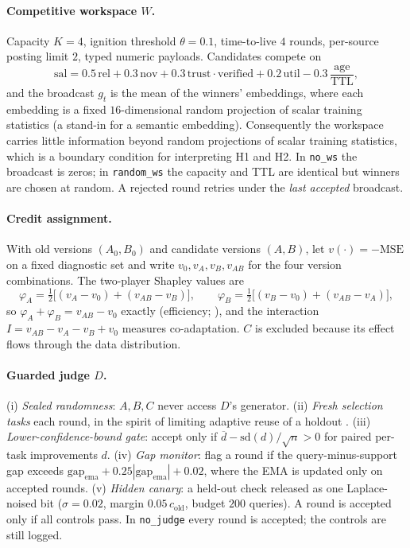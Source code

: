 \documentclass[11pt]{article}
\begin{document}
\paragraph{Competitive workspace $W$.} Capacity $K=4$, ignition threshold $\theta=0.1$, time-to-live $4$ rounds, per-source posting limit $2$, typed numeric payloads.
Candidates compete on
\begin{equation}
\text{sal}=0.5\,\text{rel}+0.3\,\text{nov}+0.3\,\text{trust}\cdot\text{verified}+0.2\,\text{util}-0.3\,\frac{\text{age}}{\text{TTL}},
\end{equation}
and the broadcast $g_t$ is the mean of the winners' embeddings, where each embedding is a fixed $16$-dimensional random projection of scalar
training statistics (a stand-in for a semantic embedding). Consequently the workspace carries little information beyond random projections of scalar
training statistics, which is a boundary condition for interpreting H1 and H2. In \texttt{no\_ws} the broadcast is zeros; in \texttt{random\_ws} the capacity and TTL are identical but winners are chosen at random.
A rejected round retries under the \emph{last accepted} broadcast.

\paragraph{Credit assignment.} With old versions $(A_0,B_0)$ and candidate versions $(A,B)$, let $v(\cdot)=-\text{MSE}$ on a fixed diagnostic set
and write $v_0,v_A,v_B,v_{AB}$ for the four version combinations. The two-player Shapley values are
\begin{equation}
\varphi_A=\tfrac12\big[(v_A-v_0)+(v_{AB}-v_B)\big],\qquad
\varphi_B=\tfrac12\big[(v_B-v_0)+(v_{AB}-v_A)\big],
\end{equation}
so $\varphi_A+\varphi_B=v_{AB}-v_0$ exactly (efficiency; \citealp{shapley1953value}), and the interaction
$I=v_{AB}-v_A-v_B+v_0$ measures co-adaptation. $C$ is excluded because its effect flows through the data distribution.

\paragraph{Guarded judge $D$.} (i) \emph{Sealed randomness}: $A,B,C$ never access $D$'s generator. (ii) \emph{Fresh selection tasks} each round, in the spirit of
limiting adaptive reuse of a holdout \citep{dwork2015holdout}. (iii) \emph{Lower-confidence-bound gate}: accept only if $\overline{d}-\mathrm{sd}(d)/\sqrt{n}>0$ for paired per-task improvements $d$.
(iv) \emph{Gap monitor}: flag a round if the query-minus-support gap exceeds $\text{gap}_{\text{ema}}+0.25|\text{gap}_{\text{ema}}|+0.02$, where the EMA is updated only on accepted rounds.
(v) \emph{Hidden canary}: a held-out check released as one Laplace-noised bit ($\sigma=0.02$, margin $0.05\,c_{\text{old}}$, budget $200$ queries).
A round is accepted only if all controls pass. In \texttt{no\_judge} every round is accepted; the controls are still logged.
\end{document}
